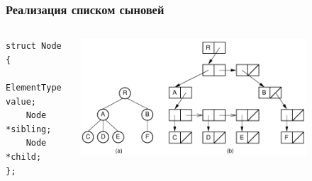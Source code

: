 \documentclass[xetex,mathserif,serif]{beamer}
\begin{document}
	\begin{frame}[fragile]
		\frametitle{Реализация списком сыновей}
		\begin{columns}
			\begin{column}{0.3\textwidth}
				\begin{footnotesize}
					\begin{verbatim}
struct Node
{
    ElementType value;
    Node *sibling;
    Node *child;
};
					\end{verbatim}
				\end{footnotesize}
			\end{column}
			\begin{column}{0.7\textwidth}
				\begin{center}
					\includegraphics[width=0.8\textwidth]{children-list.png}
				\end{center}
			\end{column}
		\end{columns}
	\end{frame}
\end{document}

